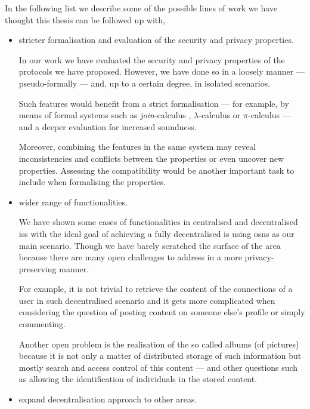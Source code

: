 In the following list we describe some of the possible lines of work we have thought 
this thesis can be followed up with,
\begin{itemize}[topsep=\parskip, parsep=\parskip, itemsep=\parskip]
    
    \item stricter formalisation and evaluation of the security and privacy properties.
    
    In our work we have evaluated the security and privacy properties of the protocols 
    we have proposed. However, we have done so in a loosely manner --- pseudo-formally 
    --- and, up to a certain degree, in isolated scenarios.
    
    Such features would benefit from a strict formalisation --- for example, by 
    means of formal systems such as \emph{join}-calculus \cite{FournetG96}, \(\lambda\)-calculus 
    \cite{Church36} or \(\pi\)-calculus \cite{MilnerPW92} --- and a deeper evaluation 
    for increased soundness.
    
    Moreover, combining the features in the same system may reveal inconsistencies 
    and conflicts between the properties or even uncover new properties. Assessing 
    the compatibility would be another important task to include when formalising 
    the properties.
    
    \item wider range of functionalities.
    
    We have shown some cases of functionalities in centralised and decentralised 
    \acp{is} with the ideal goal of achieving a fully decentralised \ac{is} using 
    \acp{osn} as our main scenario. Though we have barely scratched the surface 
    of the area because there are many open challenges to address in a more privacy-preserving 
    manner.
    
    For example, it is not trivial to retrieve the content of the connections of 
    a user in such decentralised scenario and it gets more complicated when considering 
    the question of posting content on someone else's profile or simply commenting. 
    
    Another open problem is the realisation of the so called albums (of pictures) 
    because it is not only a matter of distributed storage of such information but 
    mostly search and access control of this content --- and other questions such 
    as allowing the identification of individuals in the stored content.
    
    \item expand decentralisation approach to other areas.
    

\end{itemize}
